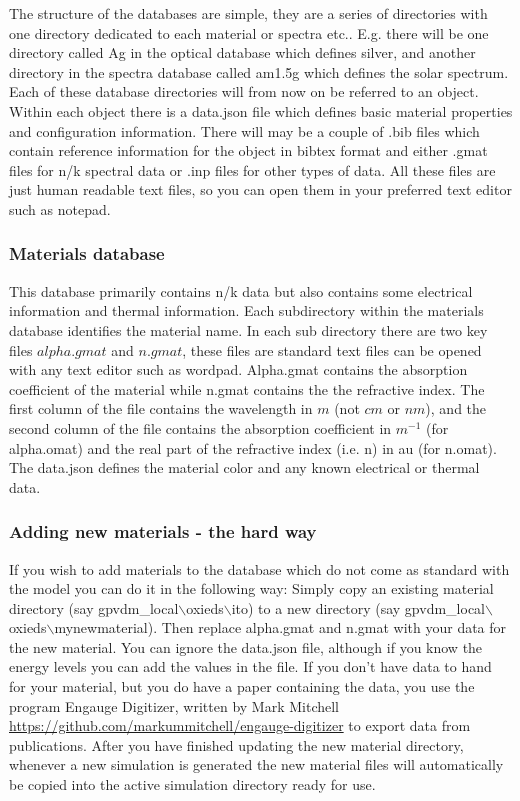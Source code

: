 The structure of the databases are simple, they are a series of directories with one directory dedicated to each material or spectra etc.. E.g. there will be one directory called Ag in the optical database which defines silver, and another directory in the spectra database called am1.5g which defines the solar spectrum.  Each of these database directories will from now on be referred to an object.  Within each object there is a data.json file which defines basic material properties and configuration information.  There will may be a couple of .bib files which contain reference information for the object in bibtex format and either .gmat files for n/k spectral data or .inp files for other types of data.  All these files are just human readable text files, so you can open them in your preferred text editor such as notepad.


\subsubsection{Materials database}
\label{sec:materialdatabase}
This database primarily contains n/k data but also contains some electrical information and thermal information. Each subdirectory within the materials database identifies the material name.  In each sub directory there are two key files $alpha.gmat$ and $n.gmat$, these files are standard text files can be opened with any text editor such as wordpad.    Alpha.gmat contains the absorption coefficient of the material while n.gmat contains the the refractive index.  The first column of the file contains the wavelength in $m$ (not $cm$ or $nm$), and the second column of the file contains the absorption coefficient in $m^{-1}$ (for alpha.omat) and the real part of the refractive index (i.e. n) in au (for n.omat). The data.json defines the material color and any known electrical or thermal data.


\subsubsection{Adding new materials - the hard way}
If you wish to add materials to the database which do not come as standard with the model you can do it in the following way:  Simply copy an existing material directory (say gpvdm\_local$\backslash$oxieds$\backslash$ito) to a new directory (say gpvdm\_local$\backslash$oxieds$\backslash$mynewmaterial).  Then replace alpha.gmat and n.gmat with your data for the new material. You can ignore the data.json file, although if you know the energy levels you can add the values in the file.
\newline
\newline
If you don't have data to hand for your material, but you do have a paper containing the data, you use the program Engauge Digitizer, written by  Mark Mitchell \url{https://github.com/markummitchell/engauge-digitizer} to export data from publications.  After you have finished updating the new material directory, whenever a new simulation is generated the new material files will automatically be copied into the active simulation directory ready for use. 

